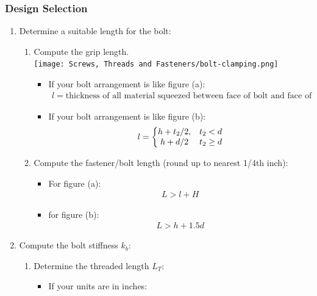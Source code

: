 \documentclass[11pt, fleqn]{article}
\begin{document}
\subsubsection{Design Selection}
\begin{enumerate}
    \item Determine a suitable length for the bolt:
    \begin{enumerate}
        \item Compute the grip length.\\
        \texttt{[image: Screws, Threads and Fasteners/bolt-clamping.png]}
        \begin{itemize}
            \item If your bolt arrangement is like figure (a):
            \begin{align*}
               l = \text{thickness of all material squeezed between face of bolt and face of nut} 
            \end{align*}
            \item If your bolt arrangement is like figure (b):
            \begin{align*}
                l=\left\{\begin{matrix} h+t_2/2, & t_2<d\\ h+d/2 & t_2\geq d \end{matrix}\right.
            \end{align*}
        \end{itemize}
        \item Compute the fastener/bolt length (round up to nearest 1/4th inch):
        \begin{itemize}
            \item For figure (a):
            \begin{align*}
                L > l + H
            \end{align*}
            \item for figure (b):
            \begin{align*}
                L > h + 1.5d
            \end{align*}
        \end{itemize}
    \end{enumerate}
    \item Compute the bolt stiffness $k_b$:
    \begin{enumerate}
        \item Determine the threaded length $L_T$:
        \begin{itemize}
            \item If your units are in inches:
            \begin{align*}

\end{align*}
\end{itemize}
\end{enumerate}
\end{enumerate}
\end{document}
